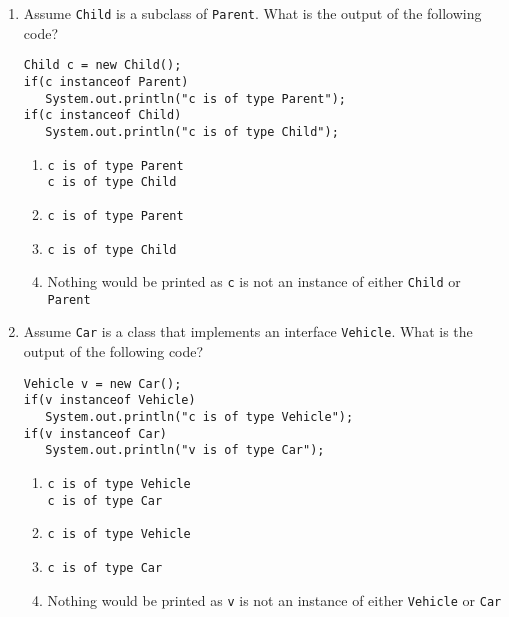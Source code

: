 \documentclass[CS180-S16-FinalExam.tex]{subfiles}
\begin{document}
\begin{enumerate}
\item Assume \texttt{Child} is a subclass of \texttt{Parent}. What is the output of the following code?
\begin{lstlisting}
Child c = new Child();
if(c instanceof Parent)
   System.out.println("c is of type Parent");
if(c instanceof Child)
   System.out.println("c is of type Child");
\end{lstlisting}
\begin{enumerate}
\item \texttt{c is of type Parent}\\\texttt{c is of type Child} \ifdraft \Ans \fi
\item \texttt{c is of type Parent}
\item \texttt{c is of type Child}
\item Nothing would be printed as \texttt{c} is not an instance of either \texttt{Child} or \texttt{Parent}
\end{enumerate}

\item  Assume \texttt{Car} is a class that implements an interface \texttt{Vehicle}. What is the output of the following code?
\begin{lstlisting}
Vehicle v = new Car();
if(v instanceof Vehicle)
   System.out.println("c is of type Vehicle");
if(v instanceof Car)
   System.out.println("v is of type Car");
\end{lstlisting}
\begin{enumerate}
\item \texttt{c is of type Vehicle}\\\texttt{c is of type Car} \ifdraft \Ans \fi
\item \texttt{c is of type Vehicle}
\item \texttt{c is of type Car}
\item Nothing would be printed as \texttt{v} is not an instance of either \texttt{Vehicle} or \texttt{Car}
\end{enumerate}




\end{enumerate}
\end{document}
